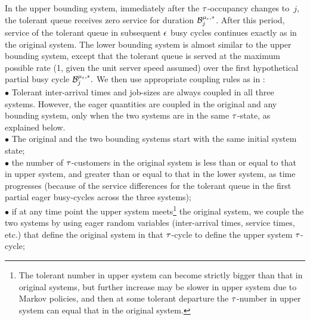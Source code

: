{In the upper bounding system, immediately after the ${\tau}$-occupancy
changes to~$j$, the tolerant queue receives zero service for duration
$\mathcal{B}_{j}^{{\mu_\epsilon}, *}$. After this period, service of the tolerant queue
in subsequent ${ \epsilon }$ busy cycles continues exactly as in the original
system.
The lower bounding system is almost similar to the upper bounding
system, except that the tolerant queue is served at the maximum
possible rate (1, given the unit server speed assumed) over the first
hypothetical partial busy cycle $\mathcal{B}_{j}^{{\mu_\epsilon}, *}.$
We then use appropriate coupling rules as in \cite{ANOR}: \\

\noindent $\bullet$ Tolerant inter-arrival times and job-sizes are
always coupled in all three systems. However, the eager quantities are
coupled in the original and any bounding system, only when the two
systems are in the same ${\tau}$-state, as explained below.\\

\noindent $\bullet$ The original and the two bounding systems start
with the same initial system state;\\

\noindent $\bullet$ the number of ${\tau}$-customers in the original
system is less than or equal to that in upper system, and greater than
or equal to that in the lower system, as time progresses (because of
the service differences for the tolerant queue in the first partial
eager busy-cycles across the three systems);\\

  
\noindent $\bullet$ if at any time point the upper system
meets\footnote{The tolerant number in upper system can become strictly
  bigger than that in original systems, but further increase may be
  slower in upper system due to Markov policies, and then at some
  tolerant departure the ${\tau}$-number in upper system can equal that in
  the original system.}  the original system, we couple the two
systems by using eager random variables (inter-arrival times, service
times, etc.) that define the original system in that ${\tau}$-cycle to
define the upper system ${\tau}$-cycle;\\
  
}
